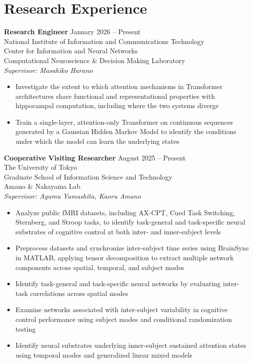 \documentclass[letterpaper,10.5pt]{article}
\begin{document}
\section*{Research Experience}
\textbf{Research Engineer} \hfill January 2026 -- Present \\ 
National Institute of Information and Communications Technology \\ 
Center for Information and Neural Networks \\ 
{\small {Computational Neuroscience \& Decision Making Laboratory}} \\ 
{\small \textit{Supervisor: Masahiko Haruno}} \\ 
\vspace{-5pt}
\begin{itemize}[itemsep=0pt, parsep=0pt, topsep=0pt]
  \item Investigate the extent to which attention mechanisms in Transformer architectures share functional and representational properties with hippocampal computation, including where the two systems diverge
  \item Train a single-layer, attention-only Transformer on continuous sequences generated by a Gaussian Hidden Markov Model to identify the conditions under which the model can learn the underlying states
\end{itemize}
\vspace{30pt}
\textbf{Cooperative Visiting Researcher} \hfill August 2025 -- Present \\ 
The University of Tokyo \\ 
Graduate School of Information Science and Technology \\ 
{\small {Amano \& Nakayama Lab}} \\ 
{\small \textit{Supervisor: Ayumu Yamashita, Kaoru Amano}} \\ 
\vspace{-5pt}
\begin{itemize}[itemsep=0pt, parsep=0pt, topsep=0pt]
  \item Analyze public fMRI datasets, including AX-CPT, Cued Task Switching, Sternberg, and Stroop tasks, to identify task-general and task-specific neural substrates of cognitive control at both inter- and inner-subject levels
  \item Preprocess datasets and synchronize inter-subject time series using BrainSync in MATLAB, applying tensor decomposition to extract multiple network components across spatial, temporal, and subject modes
  \item Identify task-general and task-specific neural networks by evaluating inter-task correlations across spatial modes
  \item Examine networks associated with inter-subject variability in cognitive control performance using subject modes and conditional randomization testing
  \item Identify neural substrates underlying inner-subject sustained attention states using temporal modes and generalized linear mixed models
\end{itemize}
\end{document}
